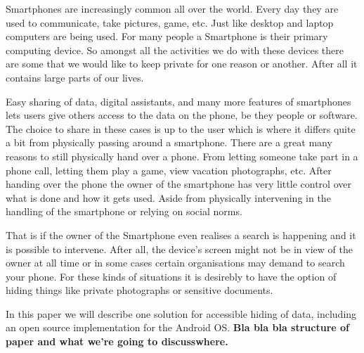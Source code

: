 Smartphones are increasingly common all over the world.
Every day they are used to communicate, take pictures, game, etc.
Just like desktop and laptop computers are being used.
For many people a Smartphone is their primary computing device.
So amongst all the activities we do with these devices there are some that we would like to keep private for one reason or another.
After all it contains large parts of our lives.

Easy sharing of data, digital assistants, and many more features of smartphones lets users give others access to the data on the phone, be they people or software.
The choice to share in these cases is up to the user which is where it differs quite a bit from physically passing around a smartphone.
There are a great many reasons to still physically hand over a phone.
From letting someone take part in a phone call, letting them play a game, view vacation photographs, etc.
After handing over the phone the owner of the smartphone has very little control over what is done and how it gets used.
Aside from physically intervening in the handling of the smartphone or relying on social norms.

That is if the owner of the Smartphone even realises a search is happening and it is possible to intervene.
After all, the device's screen might not be in view of the owner at all time or in some cases certain organisations may demand to search your phone.
For these kinds of situations it is desirebly to have the option of hiding things like private photographs or sensitive documents.

In this paper we will describe one solution for accessible hiding of data, including an open source implementation for the Android OS.
\textbf{Bla bla bla structure of paper and what we're going to discusswhere.}